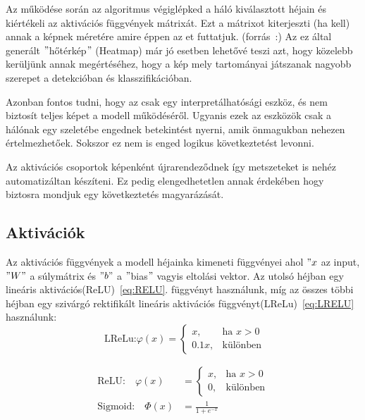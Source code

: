 \documentclass[12pt,oneside,a4paper]{article}
\theoremstyle{remark}
\begin{document}
    Az  működése során az algoritmus végiglépked a háló kiválasztott héjain és kiértékeli
     az aktivációs függvények mátrixát.
    Ezt a mátrixot kiterjeszti (ha kell) annak a képnek méretére amire éppen az et futtatjuk.
    (forrás~\cite{muhammad2020eigencam}:)
    Az ez által generált \("\)hőtérkép\("\) (Heatmap) már jó esetben lehetővé teszi azt, hogy közelebb kerüljünk
     annak megértéséhez, hogy a kép mely tartományai játszanak nagyobb szerepet a detekcióban és klasszifikációban.

     Azonban fontos tudni, hogy az  csak egy interpretálhatósági eszköz, és nem biztosít teljes képet
     a modell működéséről.
     Ugyanis ezek az eszközök csak a hálónak egy szeletébe engednek betekintést nyerni, amik önmagukban nehezen értelmezhetőek.
     Sokszor ez nem is enged logikus következtetést levonni.

     Az aktivációs csoportok képenként újrarendeződnek így metszeteket is nehéz automatizáltan készíteni.
     Ez pedig elengedhetetlen annak érdekében hogy biztosra mondjuk egy következtetés magyarázását.

\subsection{Aktivációk}\label{subsec:activations}
Az aktivációs függvények a modell héjainka kimeneti függvényei ahol \("x\) az input, \("W"\) a súlymátrix és \("b"\) a
    \("\)bias\("\) vagyis eltolási vektor.
        Az utolsó héjban egy lineáris aktivációs(\ac{ReLU})~\eqref{eq:RELU}.  \label{alignhivatkozas} függvényt használunk,
    míg az összes többi héjban egy
    szivárgó rektifikált lineáris aktivációs függvényt(\ac{LReLu})~\eqref{eq:LRELU} \label{eqhivatkozas} használunk:
    \begin{equation}
        \text{ LReLu:}
    \varphi(x) = \begin{cases}
      x, & \text{ha } x > 0 \\
      0.1x, & \text{különben}
    \end{cases}\label{eq:LRELU}
    \end{equation}\label{eq:activation_functions}


    
    \begin{align}
    	\text{ReLU:} \quad
    	\varphi(x) &= 
    	\begin{cases}
    		x, & \text{ha } x > 0 \\
    		0, & \text{különben}
    	\end{cases} \label{eq:RELU} \\
    	\text{Sigmoid:} \quad
    	\varPhi(x) &= \frac{1}{1 + e^{-x}} \label{eq:Sigmoid}
    \end{align}
\end{document}
